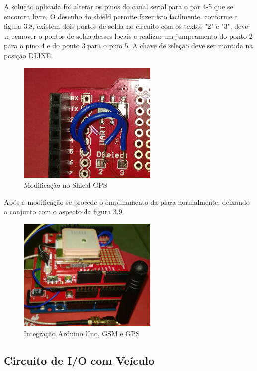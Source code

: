 A solução aplicada foi alterar os pinos do canal serial para o par 4-5 que se encontra livre. O desenho do shield permite fazer isto facilmente: conforme a figura 3.8, existem dois pontos de solda no circuito com os textos "2" e "3", deve-se remover o pontos de solda desses locais e realizar um jumpeamento do ponto 2 para o pino 4 e do ponto 3 para o pino 5. A chave de seleção deve ser mantida na posição DLINE.

\begin{figure}[!htb]
\centering
\includegraphics[width=0.6\textwidth]{figures/gpsMod.jpg}
\caption{Modificação no Shield GPS}
\label{1}
\end{figure}  

Após a modificação se procede o empilhamento da placa normalmente, deixando o conjunto com o aspecto da figura 3.9.

\begin{figure}[!htb]
\centering
\includegraphics[width=0.6\textwidth]{figures/arduinoGSMGPS.jpg}
\caption{Integração Arduino Uno, GSM e GPS}
\label{1}
\end{figure}

\subsection{Circuito de I/O com Veículo}

